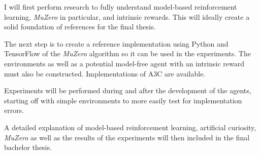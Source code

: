 \documentclass{article}
\begin{document}
I will first perform research to fully understand model-based reinforcement learning, \textit{MuZero} in particular, and intrinsic rewards. This will ideally create a solid foundation of references for the final thesis.

The next step is to create a reference implementation using Python and TensorFlow of the \textit{MuZero} algorithm so it can be used in the experiments. The environments as well as a potential model-free agent with an intrinsic reward must also be constructed. Implementations of A3C are available.

Experiments will be performed during and after the development of the agents, starting off with simple environments to more easily test for implementation errors.

A detailed explanation of model-based reinforcement learning, artificial curiosity, \textit{MuZero} as well as the results of the experiments will then included in the final bachelor thesis.




\end{document}

